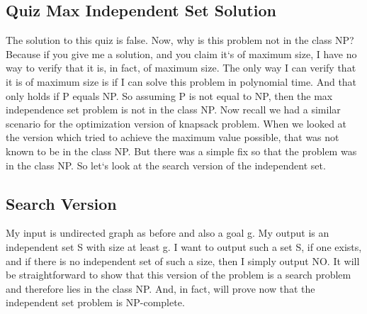 \subsection{Quiz  Max Independent Set Solution}
The solution to this quiz is false.
Now, why is this problem not in the class NP? Because if you give me a solution, and you claim it`s of maximum size, I have no way to verify that it is, in fact, of maximum size.
The only way I can verify that it is of maximum size is if I can solve this problem in polynomial time.
And that only holds if P equals NP\@.
So assuming P is not equal to NP, then the max independence set problem is not in the class NP\@.
Now recall we had a similar scenario for the optimization version of knapsack problem.
When we looked at the version which tried to achieve the maximum value possible, that was not known to be in the class NP\@.
But there was a simple fix so that the problem was in the class NP\@.
So let`s look at the search version of the independent set.

\subsection{Search Version}
My input is undirected graph as before and also a goal g.
My output is an independent set S with size at least g.
I want to output such a set S, if one exists, and if there is no independent set of such a size, then I simply output NO\@.
It will be straightforward to show that this version of the problem is a search problem and therefore lies in the class NP\@.
And, in fact, will prove now that the independent set problem is NP-complete.

